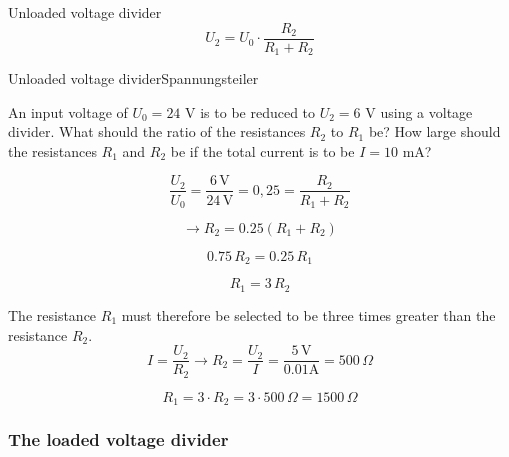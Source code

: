 \begin{frame}
{		\begin{Key point}{Unloaded voltage divider}
			\begin{equation}
				U_2 = U_0 \cdot \frac{R_2}{R_1+R_2}
			\end{equation}
		\end{Key point}
		
		
		\begin{expl}{Unloaded voltage divider}{Spannungsteiler}
			
			An input voltage of $U_0 = 24$ V is to be reduced to $U_2 = 6$ V using a voltage divider.
			What should the ratio of the resistances $R_2$ to $R_1$ be?
			How large should the resistances $R_1$ and $R_2$ be if the total current is to be $I = 10$ mA?
			
			\begin{equation*}
				\frac{U_2}{U_0} = \frac{6 \, \mathrm{V}}{24 \, \mathrm{V}} = 0,25 = \frac{R_2}{R_1+R_2}
			\end{equation*}
			
			\begin{equation*}
				\rightarrow R_2 = 0.25 (R_1+R_2)  
			\end{equation*}
			
			\begin{equation*}
				0.75 \, R_2 = 0.25 \, R_1
			\end{equation*}
			
			\begin{equation*}
				R_1 = 3 \, R_2
			\end{equation*}
			
			
			The resistance $R_1$ must therefore be selected to be three times greater than the resistance $R_2$.\\
			
			
			
			\begin{equation*}
				I = \frac{U_2}{R_2} \rightarrow R_2 = \frac{U_2}{I} = \frac{5 \, \mathrm{V}}{0.01 \mathrm{A}} = 500 \, \Omega
			\end{equation*}
			
			\begin{equation*}
				R_1 = 3 \cdot R_2 = 3 \cdot 500 \, \Omega = 1500 \, \Omega
			\end{equation*}
			
			
			
			
			
		\end{expl}
		
		\subsubsection{The loaded voltage divider}
		
}
\end{frame}
